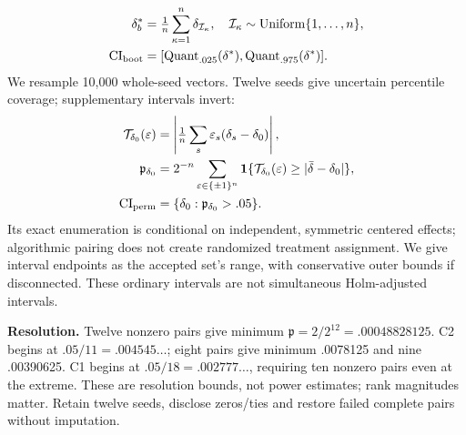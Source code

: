 \documentclass[10pt,a4paper]{article}
\begin{document}
\begin{equation}
\begin{aligned}
\delta_b^*&=\tfrac1n\sum_{\kappa=1}^n\delta_{\mathcal I_\kappa},\quad\mathcal I_\kappa\sim\operatorname{Uniform}\{1,\ldots,n\},\\
\mathrm{CI}_{\rm boot}&=[\operatorname{Quant}_{.025}(\delta^*),\operatorname{Quant}_{.975}(\delta^*)].
\end{aligned}
\label{eq:bootstrap}
\end{equation}
We resample 10,000 whole-seed vectors. Twelve seeds give uncertain percentile coverage; supplementary intervals invert:
\begin{equation}
\begin{aligned}
\mathcal T_{\delta_0}(\varepsilon)&=\left|\tfrac1n\sum_s\varepsilon_s(\delta_s-\delta_0)\right|,\\
\mathfrak p_{\delta_0}&=2^{-n}\sum_{\varepsilon\in\{\pm1\}^n}
\mathbf1\{\mathcal T_{\delta_0}(\varepsilon)\ge|\bar\delta-\delta_0|\},\\
\mathrm{CI}_{\rm perm}&=\{\delta_0:\mathfrak p_{\delta_0}>.05\}.
\end{aligned}
\label{eq:permutation}
\end{equation}
Its exact enumeration is conditional on independent, symmetric centered effects; algorithmic pairing does not create randomized treatment assignment. We give interval endpoints as the accepted set's range, with conservative outer bounds if disconnected. These ordinary intervals are not simultaneous Holm-adjusted intervals.

\textbf{Resolution.} Twelve nonzero pairs give minimum $\mathfrak p=2/2^{12}=.00048828125$. C2 begins at $.05/11=.004545\ldots$; eight pairs give minimum .0078125 and nine .00390625. C1 begins at $.05/18=.002777\ldots$, requiring ten nonzero pairs even at the extreme. These are resolution bounds, not power estimates; rank magnitudes matter. Retain twelve seeds, disclose zeros/ties and restore failed complete pairs without imputation.
\end{document}
